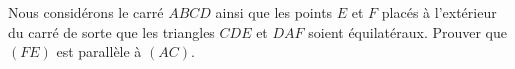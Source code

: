 
\begin{exercice}\label{exosmath-0052}

    Nous considérons le carré \( ABCD\) ainsi que les points $E$ et $F$ placés à l'extérieur du carré de sorte que les triangles $CDE$ et $DAF$ soient équilatéraux. Prouver que \( (FE)\) est parallèle à \( (AC)\).

\end{exercice}
